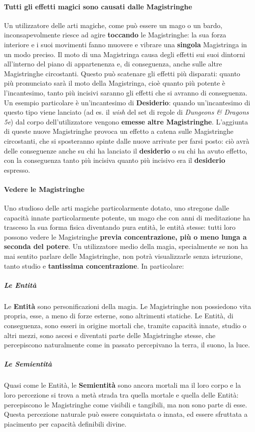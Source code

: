 \documentclass[10pt,twoside,onecolumn,openany]{book}
\begin{document}
\paragraph{Tutti gli effetti magici sono causati dalle Magistringhe} Un utilizzatore delle arti magiche, come può essere un mago o un bardo, inconsapevolmente riesce ad agire \textbf{toccando} le Magistringhe: la sua forza interiore e i suoi movimenti fanno muovere e vibrare una \textbf{singola} Magistringa in un modo preciso. Il moto di una Magistringa causa degli effetti sui suoi dintorni all'interno del piano di appartenenza e, di conseguenza, anche sulle altre Magistringhe circostanti. Questo può scatenare gli effetti più disparati: quanto più pronunciato sarà il moto della Magistringa, cioè quanto più potente è l'incantesimo, tanto più incisivi saranno gli effetti che si avranno di conseguenza.\\
Un esempio particolare è un'incantesimo di \textbf{Desiderio}: quando un'incantesimo di questo tipo viene lanciato (ad es. il \textit{wish} del set di regole di \textit{Dungeons \& Dragons 5e}) dal corpo dell'utilizzatore vengono \textbf{emesse altre Magistringhe}. L'aggiunta di queste nuove Magistringhe provoca un effetto a catena sulle Magistringhe circostanti, che si sposteranno spinte dalle nuove arrivate per farsi posto: ciò avrà delle conseguenze anche su chi ha lanciato il \textbf{desiderio} o su chi ha avuto effetto, con la conseguenza tanto più incisiva quanto più incisivo era il \textbf{desiderio} espresso.\\
\paragraph{Vedere le Magistringhe} Uno studioso delle arti magiche particolarmente dotato, uno stregone dalle capacità innate particolarmente potente, un mago che con anni di meditazione ha trasceso la sua forma fisica diventando pura entità, le entità stesse: tutti loro possono vedere le Magistringhe \textbf{previa concentrazione, più o meno lunga a seconda del potere}. Un utilizzatore medio della magia, specialmente se non ha mai sentito parlare delle Magistringhe, non potrà visualizzarle senza istruzione, tanto studio e \textbf{tantissima concentrazione}. In particolare:
\subparagraph{Le Entità} Le \textbf{Entità} sono personificazioni della magia. Le Magistringhe non possiedono vita propria, esse, a meno di forze esterne, sono altrimenti statiche. Le Entità, di conseguenza, sono esseri in origine mortali che, tramite capacità innate, studio o altri mezzi, sono ascesi e diventati parte delle Magistringhe stesse, che percepiscono naturalmente come in passato percepivano la terra, il suono, la luce.
\subparagraph{Le Semientità} Quasi come le Entità, le \textbf{Semientità} sono ancora mortali ma il loro corpo e la loro percezione si trova a metà strada tra quella mortale e quella delle Entità: percepiscono le Magistringhe come visibili e tangibili, ma non sono parte di esse. Questa percezione naturale può essere conquistata o innata, ed essere sfruttata a piacimento per capacità definibili divine.
\newpage
\end{document}
